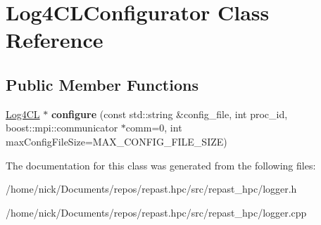 \hypertarget{class_log4_c_l_configurator}{\section{Log4\-C\-L\-Configurator Class Reference}
\label{class_log4_c_l_configurator}
}
\subsection*{Public Member Functions}
\begin{DoxyCompactItemize}
\item 
\hypertarget{class_log4_c_l_configurator_a3a3027bf647a1ee2e3103a36cf59cbf5}{\hyperlink{class_log4_c_l}{Log4\-C\-L} $\ast$ {\bfseries configure} (const std\-::string \&config\-\_\-file, int proc\-\_\-id, boost\-::mpi\-::communicator $\ast$comm=0, int max\-Config\-File\-Size=M\-A\-X\-\_\-\-C\-O\-N\-F\-I\-G\-\_\-\-F\-I\-L\-E\-\_\-\-S\-I\-Z\-E)}\label{class_log4_c_l_configurator_a3a3027bf647a1ee2e3103a36cf59cbf5}

\end{DoxyCompactItemize}


The documentation for this class was generated from the following files\-:\begin{DoxyCompactItemize}
\item 
/home/nick/\-Documents/repos/repast.\-hpc/src/repast\-\_\-hpc/logger.\-h\item 
/home/nick/\-Documents/repos/repast.\-hpc/src/repast\-\_\-hpc/logger.\-cpp\end{DoxyCompactItemize}
